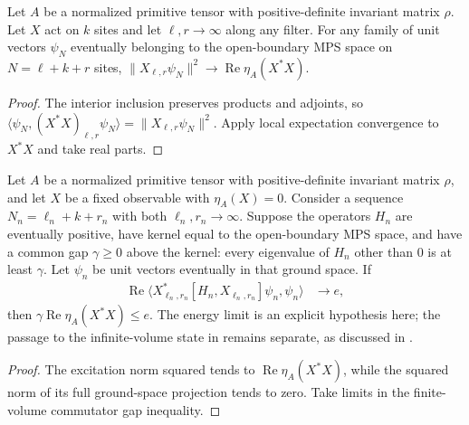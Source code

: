 \begin{lemma}
    \label{thm:primitive_bulk_excitation_norm_limit}
    \leanok
    Let $A$ be a normalized primitive tensor with positive-definite invariant
    matrix $\rho$. Let $X$ act on $k$ sites and let $\ell,r\to\infty$
    along any filter. For any family of unit vectors $\psi_N$ eventually
    belonging to the open-boundary MPS space on $N=\ell+k+r$ sites,
    $\|X_{\ell,r}\psi_N\|^2\to\operatorname{Re}\eta_A(X^*X)$.
\end{lemma}
\begin{proof}\leanok
    The interior inclusion preserves products and adjoints, so
    $\langle\psi_N,(X^*X)_{\ell,r}\psi_N\rangle
        =\|X_{\ell,r}\psi_N\|^2$.
    Apply local expectation convergence to $X^*X$ and take real parts.
\end{proof}

\begin{lemma}
    \label{thm:primitive_bulk_commutator_gap_reduction}
    \leanok
    Let $A$ be a normalized primitive tensor with positive-definite invariant
    matrix $\rho$, and let $X$ be a fixed observable with $\eta_A(X)=0$.
    Consider a sequence $N_n=\ell_n+k+r_n$ with both $\ell_n,r_n\to\infty$.
    Suppose the operators $H_n$ are eventually positive, have kernel equal
    to the open-boundary MPS space, and have a common gap $\gamma\geq0$
    above the kernel: every eigenvalue of $H_n$ other than $0$ is at least
    $\gamma$.
    Let $\psi_n$ be unit vectors eventually in that ground space.
    If
    \begin{align}
        \operatorname{Re}\langle X_{\ell_n,r_n}^*
        [H_n,X_{\ell_n,r_n}]\psi_n,\psi_n\rangle & \longrightarrow e,
    \end{align}
    then $\gamma\operatorname{Re}\eta_A(X^*X)\leq e$.
    The energy limit is an explicit hypothesis here; the passage to the
    infinite-volume state in \cite[Section~6]{Nachtergaele1996Spectral}
    remains separate, as discussed in
    \cite{gap:nachtergaele96_infinite_volume_ground_projection}.
\end{lemma}
\begin{proof}\leanok
    The excitation norm squared tends to $\operatorname{Re}\eta_A(X^*X)$,
    while the squared norm of its full ground-space projection tends to zero.
    Take limits in the finite-volume commutator gap inequality.
\end{proof}

